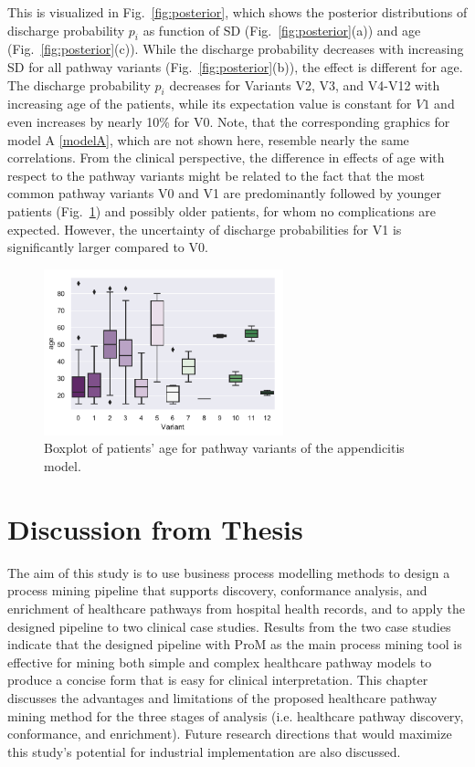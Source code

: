 This is visualized in Fig.~\ref{fig:posterior}, which shows the posterior distributions of discharge probability $p_i$ as function of SD (Fig.~\ref{fig:posterior}(a)) and age (Fig.~\ref{fig:posterior}(c)). While the discharge probability decreases with increasing SD for all pathway variants (Fig.~\ref{fig:posterior}(b)), the effect is different for age. 
The discharge probability $p_i$ decreases for Variants V2, V3, and V4-V12 with increasing age of the patients, while its expectation value is constant for $V1$ and even increases by nearly 10\% for V0. Note, that the corresponding graphics for model A \eqref{modelA}, which are not shown here, resemble nearly the same correlations. 
From the clinical perspective, the difference in effects of age with
respect to the pathway variants might be related to the fact that the
most common pathway variants V0 and V1 are predominantly followed by younger patients (Fig.~\ref{Fig:boxplot}) and possibly older patients, for whom no complications are expected. 
However, the uncertainty of discharge probabilities for V1 is significantly larger compared to V0.

\begin{figure}
  \centering
  \includegraphics[width=0.618\textwidth]{images/DS19fA0_Lin20180730a__boxplot_age_variant.pdf}
\caption{Boxplot of patients' age for pathway variants of the
  appendicitis model.}
\label{Fig:boxplot}
\end{figure}
%

\section{Discussion from Thesis}
The aim of this study is to use business process modelling methods to design a process mining pipeline that supports discovery, conformance analysis, and enrichment of healthcare pathways from hospital health records, and to apply the designed pipeline to two clinical case studies. Results from the two case studies indicate that the designed pipeline with ProM as the main process mining tool is effective for mining both simple and complex healthcare pathway models to produce a concise form that is easy for clinical interpretation. This chapter discusses the advantages and limitations of the proposed healthcare pathway mining method for the three stages of analysis (i.e. healthcare pathway discovery, conformance, and enrichment). Future research directions that would maximize this study’s potential for industrial implementation are also discussed.

